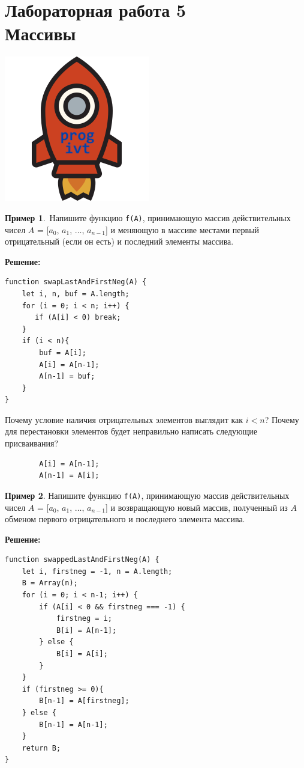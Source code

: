 \documentclass{article}
\begin{document}
\section*{{\normalsize Лабораторная работа 5} \\ Массивы}

\noindent\vskip-18mm
\null\hfill\includegraphics[scale=.13]{logo.png}
\newline

{\bf Пример 1}.~Напишите функцию \texttt{f(A)}, принимающую массив действительных чисел $A$ = [$a_0$, $a_1$, $\ldots$, $a_{n-1}$] и меняющую в массиве местами первый отрицательный (если он есть) и последний элементы массива.

\smallskip\noindent\textbf{Решение:}

\begin{verbatim}
function swapLastAndFirstNeg(A) {
    let i, n, buf = A.length;
    for (i = 0; i < n; i++) {
       if (A[i] < 0) break;
    }
    if (i < n){
        buf = A[i];
        A[i] = A[n-1];
        A[n-1] = buf;
    }
}
\end{verbatim}

\noindent Почему условие наличия отрицательных элементов выглядит как $i<n$? Почему для перестановки элементов будет неправильно написать следующие присваивания?
\begin{verbatim}
        A[i] = A[n-1]; 
        A[n-1] = A[i];
\end{verbatim}

{\bf Пример 2}. Напишите функцию \texttt{f(A)}, принимающую массив действительных чисел $A$ = [$a_0$, $a_1$, $\ldots$, $a_{n-1}$] и возвращающую новый массив, полученный из $A$ обменом первого отрицательного и последнего элемента массива.

\smallskip\noindent\textbf{Решение:}
\begin{verbatim}
function swappedLastAndFirstNeg(A) {
    let i, firstneg = -1, n = A.length;
    B = Array(n);
    for (i = 0; i < n-1; i++) {
        if (A[i] < 0 && firstneg === -1) {
            firstneg = i;
            B[i] = A[n-1];
        } else {
            B[i] = A[i];
        }
    }
    if (firstneg >= 0){
        B[n-1] = A[firstneg];
    } else {
        B[n-1] = A[n-1];
    }
    return B;
}
\end{verbatim}
\end{document}
